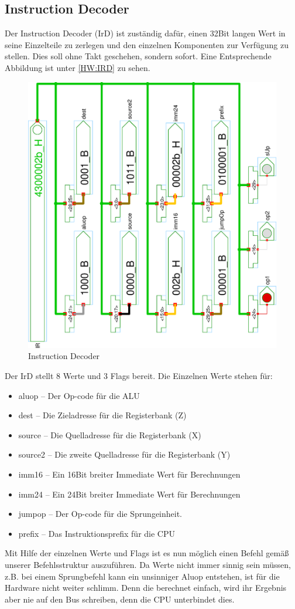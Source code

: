 \subsection{Instruction Decoder}
Der Instruction Decoder (IrD) ist zuständig dafür, einen 32Bit langen Wert in seine Einzelteile zu zerlegen und den einzelnen Komponenten zur Verfügung zu stellen. Dies soll ohne Takt geschehen, sondern sofort. Eine Entsprechende Abbildung ist unter \autoref{HW:IRD} zu sehen.\\
\begin{figure}[h]
\centering
\includegraphics[width=.8\textwidth,angle=270]{images/ir.eps}
\caption{\label{HW:IRD}Instruction Decoder}
\end{figure}
Der IrD stellt 8 Werte und 3 Flags bereit. Die Einzelnen Werte stehen für:

\begin{itemize}
  \item aluop -- Der Op-code für die ALU
  \item dest --  Die Zieladresse für die Registerbank (Z)
  \item source -- Die Quelladresse für die Registerbank (X)
  \item source2 -- Die zweite Quelladresse für die Registerbank (Y)
  \item imm16 -- Ein 16Bit breiter Immediate Wert für Berechnungen
  \item imm24 -- Ein 24Bit breiter Immediate Wert für Berechnungen
  \item jumpop -- Der Op-code für die Sprungeinheit.
  \item prefix -- Das Instruktionsprefix für die CPU
\end{itemize}
Mit Hilfe der einzelnen Werte und Flags ist es nun möglich einen Befehl gemäß unserer Befehlsstruktur auszuführen. Da Werte nicht immer sinnig sein müssen, z.B. bei einem Sprungbefehl kann ein unsinniger Aluop entstehen, ist für die Hardware nicht weiter schlimm. Denn die berechnet einfach, wird ihr Ergebnis aber nie auf den Bus schreiben, denn die CPU unterbindet dies.
